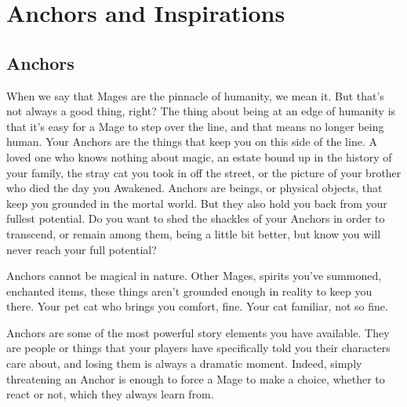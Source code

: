 \documentclass[
  oneside,
  statementpaper,
  9pt]{memoir}
\begin{document}
\newpage

\label{Anchors and Inspirations chapter}

\hypertarget{anchors-and-inspirations-1}{%
\chapter{Anchors and Inspirations}\label{anchors-and-inspirations-1}}

\hypertarget{anchors-1}{%
\section{Anchors}\label{anchors-1}}

\begin{Player}

When we say that Mages are the pinnacle of humanity, we mean it. But that’s not always a good thing, right? The thing about being at an edge of humanity is that it’s easy for a Mage to step over the line, and that means no longer being human. Your Anchors are the things that keep you on this side of the line. A loved one who knows nothing about magic, an estate bound up in the history of your family, the stray cat you took in off the street, or the picture of your brother who died the day you Awakened. Anchors are beings, or physical objects, that keep you grounded in the mortal world. But they also hold you back from your fullest potential. Do you want to shed the shackles of your Anchors in order to transcend, or remain among them, being a little bit better, but know you will never reach your full potential?

Anchors cannot be magical in nature. Other Mages, spirits you’ve summoned, enchanted items, these things aren’t grounded enough in reality to keep you there. Your pet cat who brings you comfort, fine. Your cat familiar, not so fine.

\end{Player}

\begin{MC}

Anchors are some of the most powerful story elements you have available. They are people or things that your players have specifically told you their characters care about, and losing them is always a dramatic moment. Indeed, simply threatening an Anchor is enough to force a Mage to make a choice, whether to react or not, which they always learn from.

\end{MC}
\end{document}
